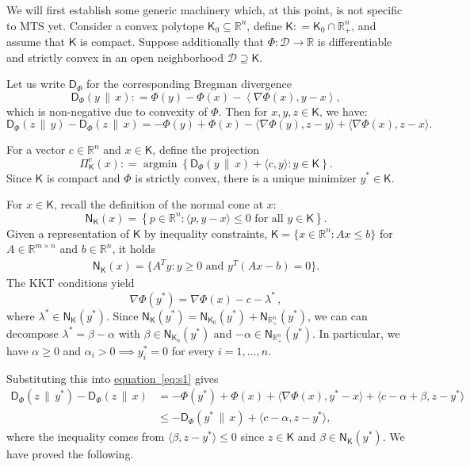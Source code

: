 \documentclass[11pt]{article}
\numberwithin{equation}{section}
\theoremstyle{definition}
\theoremstyle{plain}
\newcommand{\R}{\mathbb R}
\newcommand{\expeqref}[2]{\hyperref[#2]{#1~\eqref{#2}}}
\newcommand{\calD}{\mathcal D}
\newcommand{\dmid}{\,\|\,}
\newcommand{\seteq}{\mathrel{\mathop:}=}
\newcommand{\sfD}{\mathsf D}
\newcommand{\sfK}{\mathsf K}
\newcommand{\sfN}{\mathsf N}
\newcommand{\llangle}{\left\langle}
\newcommand{\rrangle}{\right\rangle}
\DeclareMathOperator{\argmin}{\mathrm{argmin}}
\begin{document}
We will first establish some generic machinery which, at this point, is not specific to MTS yet. Consider a convex polytope 
$\sfK_0\subseteq \R^n$, define $\sfK \seteq \sfK_0 \cap \R_+^n$, and assume that $\sfK$ is compact.
Suppose additionally that $\Phi : \calD \to \R$
is differentiable and strictly convex in an open neighborhood $\calD\supseteq \sfK$.

Let us write $\sfD_{\Phi}$ for the corresponding Bregman divergence
\[
\sfD_{\Phi}(y \dmid x) \seteq \Phi(y) - \Phi(x) - \llangle \nabla \Phi(x), y-x\rrangle,
\]
which is non-negative due to convexity of $\Phi$.
Then for $x,y,z \in \sfK$, we have:
\begin{equation}\label{eq:s1}
\sfD_{\Phi}(z \dmid y) - \sfD_{\Phi}(z \dmid x) = -\Phi(y)+\Phi(x)-\langle \nabla \Phi(y), z-y\rangle+\langle \nabla \Phi(x),z-x\rangle.
\end{equation}

For a vector $c \in \R^n$ and $x \in \sfK$, define the projection
\[
\Pi_{\sfK}^c (x) \seteq \argmin \left\{ \sfD_{\Phi}(y \dmid x) + \langle c,y\rangle : y \in \sfK \right\}.
\]
Since $\sfK$ is compact and $\Phi$ is strictly convex, there is a unique minimizer $y^* \in \sfK$.

For $x \in \sfK$, recall the definition of the normal cone at $x$:
\[\sfN_{\sfK}(x) = \left\{ p \in \R^n : \langle p, y-x\rangle \leq 0 \textrm{ for all } y \in \sfK \right\}.\]
Given a representation of $\sfK$ by inequality constraints, $\sfK=\{x\in\R^n\colon Ax\le b\}$ for $A\in\R^{m\times n}$ and $b\in\R^n$, it holds
\begin{align*}
\sfN_{\sfK}(x) = \{A^Ty\colon y\ge0\text{ and }y^T(Ax-b)=0\}.
\end{align*}
The KKT conditions yield
\begin{equation}\label{eq:KKT}
\nabla \Phi(y^*) = \nabla \Phi(x) - c - \lambda^*\,,
\end{equation}
where $\lambda^* \in \sfN_{\sfK}(y^*)$.
Since $\sfN_{\sfK}(y^*) = \sfN_{\sfK_0}(y^*) + \sfN_{\R_+^n}(y^*)$, we can
can decompose $\lambda^* = \beta - \alpha$ 
with $\beta \in \sfN_{\sfK_0}(y^*)$ and $- \alpha \in \sfN_{\R_+^n}(y^*)$.
In particular, we have $\alpha \geq 0$ and
$\alpha_i > 0 \implies y^*_i = 0$ for every $i=1,\ldots,n$.

Substituting this into \expeqref{equation}{eq:s1} gives
\begin{align*}
\sfD_{\Phi}(z \dmid y^*) - \sfD_{\Phi}(z \dmid x) &= -\Phi(y^*)+\Phi(x)+\langle \nabla \Phi(x),y^*-x\rangle +
\langle c-\alpha + \beta, z-y^* \rangle \\
&\leq -\sfD_{\Phi}(y^* \dmid x) + \langle c-\alpha, z-y^*\rangle,
\end{align*}
where the inequality comes from $\langle \beta, z-y^*\rangle \leq 0$ since $z \in \sfK$ and $\beta \in \sfN_{\sfK}(y^*)$.
We have proved the following.
\end{document}
